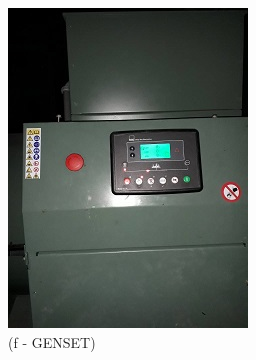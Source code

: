 \begin{figure}
\begin{minipage}[b]{0.22\linewidth}
		\includegraphics[width=\textwidth]{figures/R1P_visual/genset}
		\caption*{(f - GENSET)}
	\end{minipage}
	\hspace{0.03cm}
	\begin{minipage}[b]{0.22\linewidth}

\end{minipage}
\end{figure}
